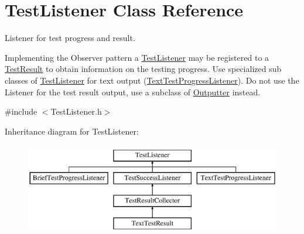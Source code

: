 \hypertarget{class_test_listener}{}\section{Test\+Listener Class Reference}
\label{class_test_listener}


Listener for test progress and result.

Implementing the Observer pattern a \hyperlink{class_test_listener}{Test\+Listener} may be registered to a \hyperlink{class_test_result}{Test\+Result} to obtain information on the testing progress. Use specialized sub classes of \hyperlink{class_test_listener}{Test\+Listener} for text output (\hyperlink{class_text_test_progress_listener}{Text\+Test\+Progress\+Listener}). Do not use the Listener for the test result output, use a subclass of \hyperlink{class_outputter}{Outputter} instead.  




{\ttfamily \#include $<$Test\+Listener.\+h$>$}

Inheritance diagram for Test\+Listener\+:\begin{figure}[H]
\begin{center}
\leavevmode
\includegraphics[height=4.000000cm]{class_test_listener}
\end{center}
\end{figure}
